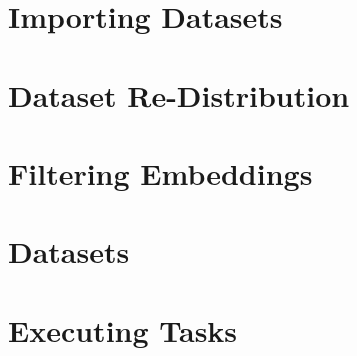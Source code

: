 \documentclass[../../fyp.tex]{subfiles}
\begin{document}
\section{Importing Datasets} \label{sec:importing_datasets}


\section{Dataset Re-Distribution} \label{sec:dataset_redist}


\section{Filtering Embeddings} \label{sec:filtering_embeddings}


\section{Datasets}


\section{Executing Tasks} \label{sec:executing_tasks}

\end{document}

